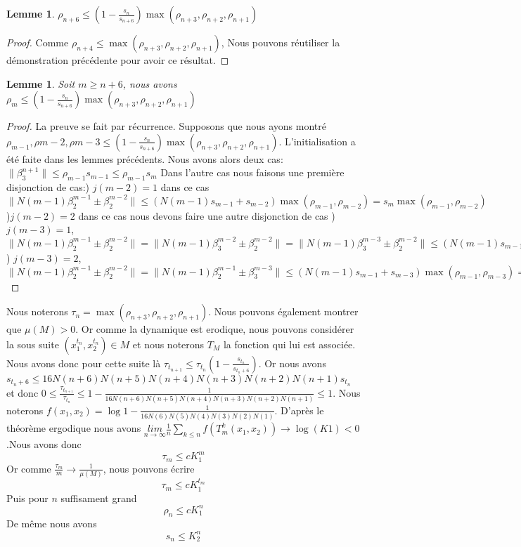\documentclass[12pt]{article}
\theoremstyle{plain}%
\newtheorem{lem}[thm]{Lemme}
\theoremstyle{definition}
\theoremstyle{remark}
\begin{document}
\begin{lem}
$\rho_{n+6} \leq (1-\frac{s_n}{s_{n+6}})\max{(\rho_{n+3},\rho_{n+2},\rho_{n+1})}$
\end{lem}
\begin{proof}
Comme $\rho_{n+4} \leq \max{(\rho_{n+3},\rho_{n+2},\rho_{n+1})}$, Nous pouvons réutiliser la démonstration précédente pour avoir ce résultat.
\end{proof}
\begin{lem}
Soit $m \geq n+6$, nous avons $\rho_m \leq (1-\frac{s_n}{s_{n+6}})\max{(\rho_{n+3},\rho_{n+2},\rho_{n+1})}$
\end{lem}
\begin{proof}
La preuve se fait par récurrence. Supposons que nous ayons montré $\rho_{m-1},\rho{m-2},\rho{m-3} \leq (1-\frac{s_n}{s_{n+6}})\max{(\rho_{n+3},\rho_{n+2},\rho_{n+1})}$. L'initialisation a été faite dans les lemmes précédents. Nous avons alors deux cas: \newline
$\| \beta_3^{n+1} \| \leq \rho_{m-1} s_{m-1} \leq \rho_{m-1} s_m$ \newline
Dans l'autre cas nous faisons une première disjonction de cas:) $j(m-2)=1$ dans ce cas $\|N(m-1)\beta_2^{m-1} \pm \beta_2^{m-2}\| \leq (N(m-1)s_{m-1}+s_{m-2}) \max{(\rho_{m-1},\rho_{m-2})}=s_m \max{(\rho_{m-1},\rho_{m-2})}$)$j(m-2)=2$ dans ce cas nous devons faire une autre disjonction de cas ) $j(m-3)=1$, $\|N(m-1)\beta_2^{m-1} \pm \beta_2^{m-2}\|=\|N(m-1)\beta_3^{m-2} \pm \beta_2^{m-2}\|=\|N(m-1)\beta_3^{m-3} \pm \beta_2^{m-2}\| \leq (N(m-1)s_{m-1}+s_{m-3}) \max{(\rho_{m-1},\rho_{m-3})}=s_m \max{(\rho_{m-1},\rho_{m-3})} $) $j(m-3)=2$, $\|N(m-1)\beta_2^{m-1} \pm \beta_2^{m-2}\|=\|N(m-1)\beta_2^{m-1} \pm \beta_3^{m-3}\| \leq (N(m-1)s_{m-1}+s_{m-3})\max{(\rho_{m-1},\rho_{m-3})}=s_m \max{(\rho_{m-1},\rho_{m-3})}$
\end{proof}

Nous noterons $\tau_n=\max{(\rho_{n+3},\rho_{n+2},\rho_{n+1})}$.\newline
Nous pouvons également montrer que $\mu(M)>0$. Or comme la dynamique est erodique, nous pouvons considérer la sous suite $(x_1^{t_n},x_2^{t_n})\in M$ et nous noterons $T_M$ la fonction qui lui est associée. Nous avons donc pour cette suite là $\tau_{t_{n+1}} \leq \tau_{t_{n}}(1-\frac{s_{t_n}}{s_{t_n+6}})$. \newline
Or nous avons $s_{t_n+6} \leq 16 N(n+6)N(n+5)N(n+4)N(n+3)N(n+2)N(n+1)s_{t_n}$ et donc $0 \leq \frac{\tau_{t_{n+1}}}{\tau_{t_{n}}} \leq 1-\frac{1}{16 N(n+6)N(n+5)N(n+4)N(n+3)N(n+2)N(n+1)} \leq 1$. Nous noterons $f(x_1,x_2)=\log{1-\frac{1}{16 N(6)N(5)N(4)N(3)N(2)N(1)}}$.
D'après le théorème ergodique nous avons $\underset{n \to \infty}{lim}\frac{1}{n}\sum_{k \leq n}f(T_m^k(x_1,x_2)) \to \log(K1) <0$.Nous avons donc$$
\tau_m \leq c K_1^{m}
$$
Or comme $\frac{\tau_m}{m} \to \frac{1}{\mu(M)}$, nous pouvons écrire$$
\tau_m \leq c K_1^{t_m}
$$
Puis pour $n$ suffisament grand$$
\rho_n \leq c K_1^n
$$
De même nous avons$$
s_n \leq K_2^n
$$
\end{document}
